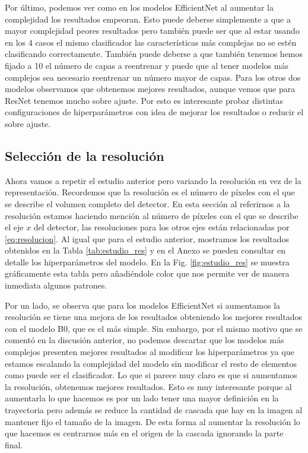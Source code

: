 \documentclass[a4paper,12pt,twoside,titlepage]{article}
\begin{document}
Por último, podemos ver como en los modelos EfficientNet al aumentar la complejidad los resultados empeoran. Esto puede deberse simplemente a que a mayor complejidad peores resultados pero también puede ser que al estar usando en los 4 casos el mismo clasificador las características más complejas no se estén clasificando correctamente. También puede deberse a que también tenemos hemos fijado a 10 el número de capas a reentrenar y puede que al tener modelos más complejos sea necesario reentrenar un número mayor de capas. Para los otros dos modelos observamos que obtenemos mejores resultados, aunque vemos que para ResNet tenemos mucho sobre ajuste. Por esto es interesante probar distintas configuraciones de hiperparámetros con idea de mejorar los resultados o reducir el sobre ajuste.  

\subsection{Selección de la resolución}

Ahora vamos a repetir el estudio anterior pero variando la resolución en vez de la representación. Recordemos que la resolución es el número de píxeles con el que se describe el volumen completo del detector. En esta sección al referirnos a la resolución estamos haciendo mención al número de píxeles con el que se describe el eje $x$ del detector, las resoluciones para los otros ejes están relacionadas por \ref{eq:resolucion}. Al igual que para el estudio anterior, mostramos los resultados obtenidos en la Tabla \ref{tab:estudio_res} y en el Anexo se pueden consultar en detalle los hiperparámetros del modelo. En la Fig. \ref{fig:estudio_res} se muestra gráficamente esta tabla pero añadiéndole color que nos permite ver de manera inmediata algunos patrones.

Por un lado, se observa que para los modelos EfficientNet si aumentamos la resolución se tiene una mejora de los resultados obteniendo los mejores resultados con el modelo B0, que es el más simple. Sin embargo, por el mismo motivo que se comentó en la discusión anterior, no podemos descartar que los modelos más complejos presenten mejores resultados al modificar los hiperparámetros ya que estamos escalando la complejidad del modelo sin modificar el resto de elementos como puede ser el clasificador. Lo que si parece muy claro es que si aumentamos la resolución, obtenemos mejores resultados. Esto es muy interesante porque al aumentarla lo que hacemos es por un lado tener una mayor definición en la trayectoria pero además se reduce la cantidad de cascada que hay en la imagen al mantener fijo el tamaño de la imagen. De esta forma al aumentar la resolución lo que hacemos es centrarnos más en el origen de la cascada ignorando la parte final.
\end{document}
